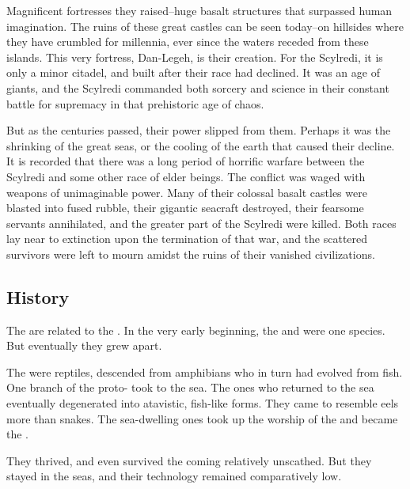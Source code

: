 {{    Magnificent fortresses they raised--huge basalt structures that surpassed human imagination. The ruins
    of these great castles can be seen today--on hillsides where they have crumbled for millennia, ever since
    the waters receded from these islands. This very fortress, Dan-Legeh, is their creation. For the Scylredi,
    it is only a minor citadel, and built after their race had declined. It was an age of giants, and the Scylredi
    commanded both sorcery and science in their constant battle for supremacy in that prehistoric age of
    chaos.
    
    But as the centuries passed, their power slipped from them. Perhaps it was the shrinking of the great
    seas, or the cooling of the earth that caused their decline. It is recorded that there was a long period of
    horrific warfare between the Scylredi and some other race of elder beings. The conflict was waged with
    weapons of unimaginable power. Many of their colossal basalt castles were blasted into fused rubble,
    their gigantic seacraft destroyed, their fearsome servants annihilated, and the greater part of the Scylredi
    were killed. Both races lay near to extinction upon the termination of that war, and the scattered survivors
    were left to mourn amidst the ruins of their vanished civilizations.}
}








\subsection{History}
The \nagae{} are related to the . 
In the very early beginning, the \ophidians{} and \nagae{} were one species. 
But eventually they grew apart. 

The \ophidians{} were reptiles, descended from amphibians who in turn had evolved from fish. 
One branch of the proto-\ophidians{} took to the sea. 
The ones who returned to the sea eventually degenerated into atavistic, fish-like forms. 
They came to resemble eels more than snakes. 
The sea-dwelling ones took up the worship of the \Krakens{} and became the \nagae{}.  

They thrived, and even survived the coming \firstbanewar{} relatively unscathed. 
But they stayed in the seas, and their technology remained comparatively low.









